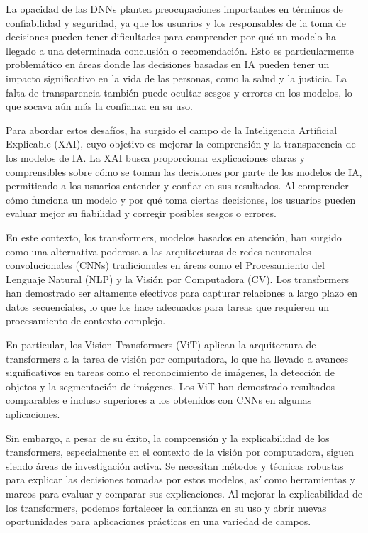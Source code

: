 La opacidad de las DNNs plantea preocupaciones importantes en términos de confiabilidad y seguridad, ya que los usuarios y los responsables de la toma de decisiones pueden tener dificultades para comprender por qué un modelo ha llegado a una determinada conclusión o recomendación. Esto es particularmente problemático en áreas donde las decisiones basadas en IA pueden tener un impacto significativo en la vida de las personas, como la salud y la justicia. La falta de transparencia también puede ocultar sesgos y errores en los modelos, lo que socava aún más la confianza en su uso.

Para abordar estos desafíos, ha surgido el campo de la Inteligencia Artificial Explicable (XAI), cuyo objetivo es mejorar la comprensión y la transparencia de los modelos de IA. La XAI busca proporcionar explicaciones claras y comprensibles sobre cómo se toman las decisiones por parte de los modelos de IA, permitiendo a los usuarios entender y confiar en sus resultados. Al comprender cómo funciona un modelo y por qué toma ciertas decisiones, los usuarios pueden evaluar mejor su fiabilidad y corregir posibles sesgos o errores.

En este contexto, los transformers, modelos basados en atención, han surgido como una alternativa poderosa a las arquitecturas de redes neuronales convolucionales (CNNs) tradicionales en áreas como el Procesamiento del Lenguaje Natural (NLP) y la Visión por Computadora (CV). Los transformers han demostrado ser altamente efectivos para capturar relaciones a largo plazo en datos secuenciales, lo que los hace adecuados para tareas que requieren un procesamiento de contexto complejo.

En particular, los Vision Transformers (ViT) aplican la arquitectura de transformers a la tarea de visión por computadora, lo que ha llevado a avances significativos en tareas como el reconocimiento de imágenes, la detección de objetos y la segmentación de imágenes. Los ViT han demostrado resultados comparables e incluso superiores a los obtenidos con CNNs en algunas aplicaciones.

Sin embargo, a pesar de su éxito, la comprensión y la explicabilidad de los transformers, especialmente en el contexto de la visión por computadora, siguen siendo áreas de investigación activa. Se necesitan métodos y técnicas robustas para explicar las decisiones tomadas por estos modelos, así como herramientas y marcos para evaluar y comparar sus explicaciones. Al mejorar la explicabilidad de los transformers, podemos fortalecer la confianza en su uso y abrir nuevas oportunidades para aplicaciones prácticas en una variedad de campos.

